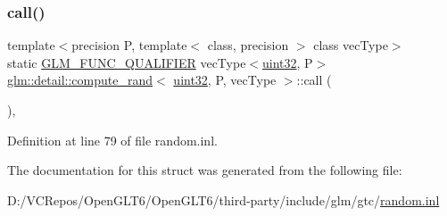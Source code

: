 \subsubsection{\texorpdfstring{call()}{call()}}
{\footnotesize\ttfamily template$<$precision P, template$<$ class, precision $>$ class vec\+Type$>$ \\
static \mbox{\hyperlink{setup_8hpp_a33fdea6f91c5f834105f7415e2a64407}{G\+L\+M\+\_\+\+F\+U\+N\+C\+\_\+\+Q\+U\+A\+L\+I\+F\+I\+ER}} vec\+Type$<$\mbox{\hyperlink{namespaceglm_1_1detail_ade6cfbf377022aaa391af8cd50489222}{uint32}}, P$>$ \mbox{\hyperlink{structglm_1_1detail_1_1compute__rand}{glm\+::detail\+::compute\+\_\+rand}}$<$ \mbox{\hyperlink{namespaceglm_1_1detail_ade6cfbf377022aaa391af8cd50489222}{uint32}}, P, vec\+Type $>$\+::call (\begin{DoxyParamCaption}{ }\end{DoxyParamCaption})\hspace{0.3cm}{\ttfamily [inline]}, {\ttfamily [static]}}



Definition at line 79 of file random.\+inl.



The documentation for this struct was generated from the following file\+:\begin{DoxyCompactItemize}
\item 
D\+:/\+V\+C\+Repos/\+Open\+G\+L\+T6/\+Open\+G\+L\+T6/third-\/party/include/glm/gtc/\mbox{\hyperlink{random_8inl}{random.\+inl}}\end{DoxyCompactItemize}
